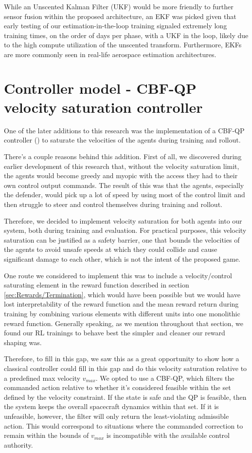 While an Unscented Kalman Filter (UKF) would be more friendly to further sensor fusion within the proposed architecture, an EKF was picked given that early testing of our estimation-in-the-loop training signaled extremely long training times, on the order of days per phase, with a UKF in the loop, likely due to the high compute utilization of the unscented transform. Furthermore, EKFs are more commonly seen in real-life aerospace estimation architectures.


\section{Controller model - CBF-QP velocity saturation controller}
\label{sec:controller-model-cbf-qp}

One of the later additions to this research was the implementation of a CBF-QP controller (\cite{ames2017control}) to saturate the velocities of the agents during training and rollout.

There's a couple reasons behind this addition. First of all, we discovered during earlier development of this research that, without the velocity saturation limit, the agents would become greedy and myopic with the access they had to their own control output commands. The result of this was that the agents, especially the defender, would pick up a lot of speed by using most of the control limit and then struggle to steer and control themselves during training and rollout. 

Therefore, we decided to implement velocity saturation for both agents into our system, both during training and evaluation. For practical purposes, this velocity saturation can be justified as a safety barrier, one that bounds the velocities of the agents to avoid unsafe speeds at which they could collide and cause significant damage to each other, which is not the intent of the proposed game.

One route we considered to implement this was to include a velocity/control saturating element in the reward function described in section \ref{sec:Rewards/Termination}, which would have been possible but we would have lost interpretability of the reward function and the mean reward return during training by combining various elements with different units into one monolithic reward function. Generally speaking, as we mention throughout that section, we found our RL trainings to behave best the simpler and cleaner our reward shaping was.

Therefore, to fill in this gap, we saw this as a great opportunity to show how a classical controller could fill in this gap and do this velocity saturation relative to a predefined max velocity $v_{max}$. We opted to use a CBF-QP, which filters the commanded action relative to whether it's considered feasible within the set defined by the velocity constraint. If the state is safe and the QP is feasible, then the system keeps the overall spacecraft dynamics within that set. If it is unfeasible, however, the filter will only return the least-violating admissible action. This would correspond to situations where the commanded correction to remain within the bounds of $v_{max}$ is incompatible with the available control authority.

